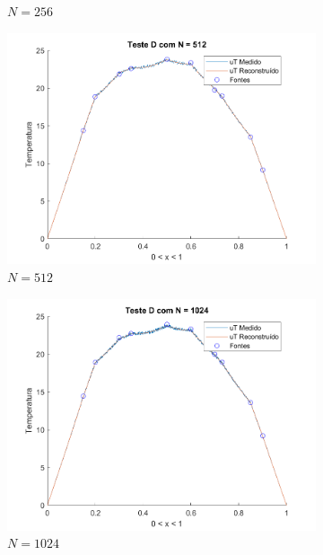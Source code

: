 \documentclass[12pt]{article}
\begin{document}
\begin{spacing}{1.5}
\begin{figure}[H]
\begin{subfigure}[t]{.485\linewidth}
        \caption{$N=256$}
        \label{fig:testeD_256}
    \end{subfigure}
    \begin{subfigure}[t]{.485\linewidth}
        \centering
        \includegraphics[width=1\linewidth]{Imagens/FigD512.png}
        \caption{$N=512$}
        \label{fig:testeD_512}
    \end{subfigure}
    \begin{subfigure}[t]{.485\linewidth}
        \centering
        \includegraphics[width=1\linewidth]{Imagens/FigD1024.png}
        \caption{$N=1024$}
        \label{fig:testeD_1024}
    \end{subfigure}
    \begin{subfigure}[t]{.485\linewidth}

\end{subfigure}
\end{figure}
\end{spacing}
\end{document}

